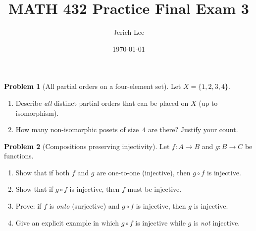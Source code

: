 \documentclass[12pt]{article}
\title{MATH 432 Practice Final Exam 3}
\author{Jerich Lee}
\date{\today}
\theoremstyle{definition} %
\newtheorem{problem}{Problem}
\theoremstyle{plain} %
\begin{document}
\maketitle


\begin{problem}[All partial orders on a four-element set]
  Let $X=\{1,2,3,4\}$.
  \begin{enumerate}[label=(\alph*)]
    \item Describe \emph{all} distinct partial orders that can be placed
          on $X$ (up to isomorphism).  
    \item How many non-isomorphic posets of size~$4$ are there?
          Justify your count.
  \end{enumerate}
\end{problem}

\begin{problem}[Compositions preserving injectivity]
  Let $f:A\to B$ and $g:B\to C$ be functions.
  \begin{enumerate}[label=(\alph*)]
    \item Show that if both $f$ and $g$ are one-to-one
          (injective), then $g\circ f$ is injective.
    \item Show that if $g\circ f$ is injective, then $f$ must be
          injective.
    \item Prove: if $f$ is \emph{onto} (surjective) and
          $g\circ f$ is injective, then $g$ is injective.
    \item Give an explicit example in which $g\circ f$ is injective
          while $g$ is \emph{not} injective.
  \end{enumerate}
\end{problem}
\end{document}

